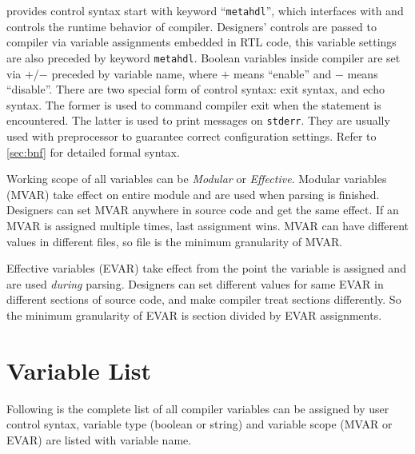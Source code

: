 \mhdl{} provides control syntax start with keyword ``\texttt{metahdl}'', 
which interfaces with \mhdlc{} and controls the runtime behavior of compiler. 
Designers' controls are passed to compiler via variable assignments embedded 
in RTL code, this variable settings are also preceded by keyword \texttt{metahdl}.
Boolean variables inside compiler are set via $+$/$-$ preceded by variable name, 
where $+$ means ``enable'' and $-$ means ``disable''. 
There are two special form of control syntax: exit syntax, and echo syntax. 
The former is used to command compiler exit when the statement is encountered. 
The latter is used to print messages on \texttt{stderr}. They are usually used 
with preprocessor to guarantee correct configuration settings. 
Refer to \autoref{sec:bnf} for detailed formal syntax.

Working scope of all variables can be \emph{Modular} or \emph{Effective}. 
Modular variables (MVAR) take effect on entire module and are used when parsing is finished. 
Designers can set MVAR anywhere in source code and get the same 
effect. If an MVAR is assigned multiple times, last assignment wins. 
MVAR can have different values in different files, so file is
the minimum granularity of MVAR.

Effective variables (EVAR) take effect from the point the variable is assigned
and are used \emph{during} parsing. Designers can set different values for same EVAR in different
sections of source code, and make compiler treat sections differently. So the minimum granularity 
of EVAR is section divided by EVAR assignments.

\section{Variable List}
Following is the complete list of all compiler variables can be assigned by user control 
syntax, variable type (boolean or string) and variable scope (MVAR or EVAR)  are listed
with variable name. 




